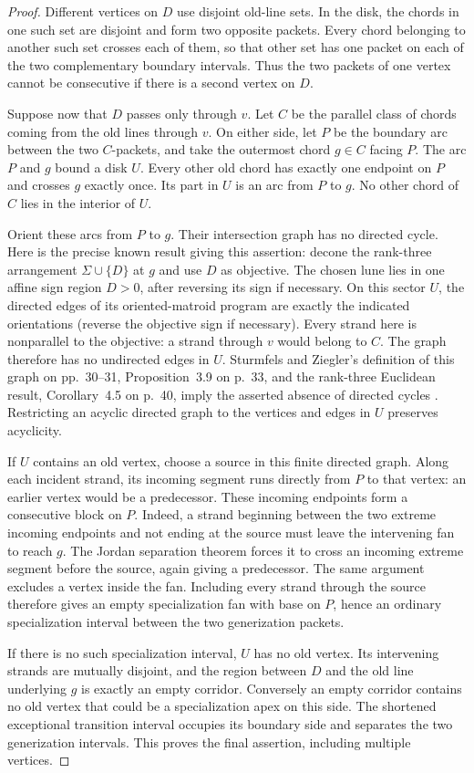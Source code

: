 \documentclass[11pt]{article}
\theoremstyle{definition}\newtheorem{definition}[theorem]{Definition}
\begin{document}
\begin{proof}
Different vertices on $D$ use disjoint old-line sets. In the disk, the
chords in one such set are disjoint and form two opposite packets. Every
chord belonging to another such set crosses each of them, so that other
set has one packet on each of the two complementary boundary intervals.
Thus the two packets of one vertex cannot be consecutive if there is a
second vertex on $D$.

Suppose now that $D$ passes only through $v$. Let $C$ be the parallel
class of chords coming from the old lines through $v$. On either side,
let $P$ be the boundary arc between the two $C$-packets, and take the
outermost chord $g\in C$ facing $P$. The arc $P$ and $g$ bound a disk
$U$. Every other old chord has exactly one endpoint on $P$ and crosses
$g$ exactly once. Its part in $U$ is an arc from $P$ to $g$. No other
chord of $C$ lies in the interior of $U$.

Orient these arcs from $P$ to $g$. Their intersection graph has no
directed cycle. Here is the precise known result giving this assertion:
decone the rank-three arrangement $\Sigma\cup\{D\}$ at $g$ and use
$D$ as objective. The chosen lune lies in one affine sign region
$D>0$, after reversing its sign if necessary. On this sector $U$, the directed edges
of its oriented-matroid program are exactly the indicated orientations
(reverse the objective sign if necessary). Every strand here is
nonparallel to the objective: a strand through $v$ would belong to $C$.
The graph therefore has no undirected edges in $U$.
Sturmfels and Ziegler's definition of this graph on pp.~30--31,
Proposition~3.9 on p.~33, and the rank-three Euclidean result,
Corollary~4.5 on p.~40, imply the asserted absence of directed cycles
\cite{SZ1993}. Restricting an acyclic directed graph to
the vertices and edges in $U$ preserves acyclicity.

If $U$ contains an old vertex, choose a source in this finite directed
graph. Along each incident strand, its incoming segment runs directly
from $P$ to that vertex: an earlier vertex would be a predecessor.
These incoming endpoints form a consecutive block on $P$. Indeed, a
strand beginning between the two extreme incoming endpoints and not
ending at the source must leave the intervening fan to reach $g$.
The Jordan separation theorem forces it to cross an incoming extreme
segment before the source, again giving a predecessor. The same
argument excludes a vertex inside the fan. Including every strand
through the source therefore gives an empty specialization fan with
base on $P$, hence an ordinary specialization interval between the
two generization packets.

If there is no such specialization interval, $U$ has no old vertex.
Its intervening strands are mutually disjoint, and the region between
$D$ and the old line underlying $g$ is exactly an empty corridor.
Conversely an empty corridor contains no old vertex that could be a
specialization apex on this side. The shortened exceptional transition
interval occupies its boundary side and separates the two generization
intervals. This proves the final assertion, including multiple vertices.
\end{proof}
\end{document}
